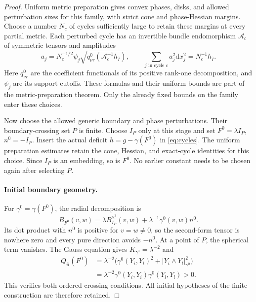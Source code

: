 \documentclass[11pt,a4paper]{article}
\newcommand{\Sph}{\mathbb S}
\newcommand{\dd}{\mathrm d}
\theoremstyle{definition}
\theoremstyle{remark}
\numberwithin{equation}{section}
\begin{document}
\begin{proof}
Uniform metric preparation gives convex phases, disks, and allowed
perturbation sizes for this family, with strict cone and phase-Hessian
margins. Choose a number $N_c$ of cycles sufficiently large to retain
these margins at every partial metric. Each perturbed cycle has an
invertible bundle endomorphism $\mathcal A_c$ of symmetric tensors and
amplitudes
\begin{equation}
 a_j=N_c^{-1/2}\psi_j
       \sqrt{q^0_{\nu r}(\mathcal A_c^{-1}h_{\overline I})},
 \qquad
 \sum_{j\text{ in cycle }c}a_j^2\dd x_j^2=N_c^{-1}h_{\overline I}.
 \label{eq:cycles}
\end{equation}
Here $q^0_{\nu r}$ are the coefficient functionals of its positive
rank-one decomposition, and $\psi_j$ are its support cutoffs.
These formulas and their uniform bounds are part of the metric-preparation
theorem. Only the already fixed bounds on the family enter these choices.

Now choose the allowed generic boundary and phase perturbations.
Their boundary-crossing set $P$ is finite. Choose $I_P$ only at this
stage and set $F^0=\lambda I_P$, $n^0=-I_P$. Insert the actual deficit
$h=g-\gamma(F^0)$ in \eqref{eq:cycles}. The uniform preparation estimates
retain the cone, Hessian, and exact-cycle identities for this choice.
Since $I_P$ is an embedding, so is $F^0$. No earlier constant needs to
be chosen again after selecting $P$.

\paragraph{Initial boundary geometry.}
For $\gamma^0=\gamma(F^0)$, the radial decomposition is
\begin{equation}
 B_{F^0}(v,w)=\lambda B^{\Sph^3}_{I_P}(v,w)
                +\lambda^{-1}\gamma^0(v,w)n^0.
 \label{eq:radial}
\end{equation}
Its dot product with $n^0$ is positive for $v=w\ne0$, so the second-form
tensor is nowhere zero and every pure direction avoids $-n^0$.
At a point of $P$, the spherical term vanishes. The Gauss equation gives
$K_{\gamma^0}=\lambda^{-2}$ and
\begin{equation}
 \begin{aligned}
 Q_{il}(F^0)
 &=\lambda^{-2}\bigl(\gamma^0(Y_i,Y_l)^2+
                         |Y_i\wedge Y_l|_{\gamma^0}^2\bigr)\\
 &=\lambda^{-2}\gamma^0(Y_i,Y_i)\gamma^0(Y_l,Y_l)>0.
 \end{aligned}
 \label{eq:initial-crossing}
\end{equation}
This verifies both ordered crossing conditions. All initial hypotheses
of the finite construction are therefore retained.
\end{proof}
\end{document}
